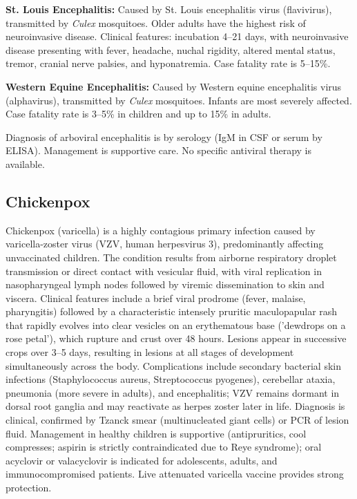 \textbf{St. Louis Encephalitis:} Caused by St. Louis encephalitis virus (flavivirus), transmitted by \textit{Culex} mosquitoes. Older adults have the highest risk of neuroinvasive disease. Clinical features: incubation 4--21 days, with neuroinvasive disease presenting with fever, headache, nuchal rigidity, altered mental status, tremor, cranial nerve palsies, and hyponatremia. Case fatality rate is 5--15\%.

\textbf{Western Equine Encephalitis:} Caused by Western equine encephalitis virus (alphavirus), transmitted by \textit{Culex} mosquitoes. Infants are most severely affected. Case fatality rate is 3--5\% in children and up to 15\% in adults.

Diagnosis of arboviral encephalitis is by serology (IgM in CSF or serum by ELISA). Management is supportive care. No specific antiviral therapy is available.

\subsection{Chickenpox}
\label{sec:Chickenpox}
Chickenpox (varicella) is a highly contagious primary infection caused by varicella-zoster virus (VZV, human herpesvirus 3), predominantly affecting unvaccinated children. The condition results from airborne respiratory droplet transmission or direct contact with vesicular fluid, with viral replication in nasopharyngeal lymph nodes followed by viremic dissemination to skin and viscera. Clinical features include a brief viral prodrome (fever, malaise, pharyngitis) followed by a characteristic intensely pruritic maculopapular rash that rapidly evolves into clear vesicles on an erythematous base ('dewdrops on a rose petal'), which rupture and crust over 48 hours. Lesions appear in successive crops over 3--5 days, resulting in lesions at all stages of development simultaneously across the body. Complications include secondary bacterial skin infections (Staphylococcus aureus, Streptococcus pyogenes), cerebellar ataxia, pneumonia (more severe in adults), and encephalitis; VZV remains dormant in dorsal root ganglia and may reactivate as herpes zoster later in life. Diagnosis is clinical, confirmed by Tzanck smear (multinucleated giant cells) or PCR of lesion fluid. Management in healthy children is supportive (antipruritics, cool compresses; aspirin is strictly contraindicated due to Reye syndrome); oral acyclovir or valacyclovir is indicated for adolescents, adults, and immunocompromised patients. Live attenuated varicella vaccine provides strong protection.

